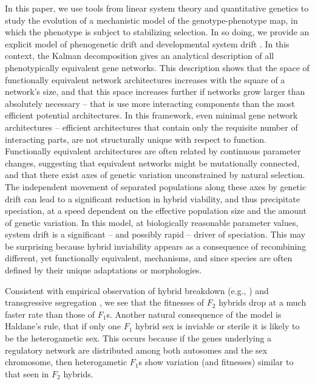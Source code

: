 \documentclass{article}
\newcommand{\plr}[1]{\todo[color=blue!25]{#1}}
\newcommand{\plr}[1]{{\color{blue}\it #1}}
\newcommand{\1}{\mathbbm{1}}
\begin{document}
In this paper, we use tools from linear system theory and quantitative genetics
to study the evolution of a mechanistic model of the genotype-phenotype map, 
in which the phenotype is subject to stabilizing selection.
In so doing, we provide an explicit model of
phenogenetic drift \citep{weiss2000phenogenetic} and developmental system drift \citep{true2001developmental}.
In this context, the Kalman decomposition \citep{kalman1963mathematical}
gives an analytical description of all phenotypically equivalent gene networks.
This description shows that the space of functionally equivalent network architectures increases with the square of a network's size,
and that this space increases further if networks grow larger than absolutely necessary -- that is use more interacting components than the most efficient potential architectures.
In this framework, even minimal gene network architectures -- efficient architectures that contain only the requisite number of interacting parts,
are not structurally unique with respect to function.
Functionally equivalent architectures are often related by continuous parameter changes, suggesting that equivalent networks might be mutationally connected, 
and that there exist axes of genetic variation unconstrained by natural selection.
The independent movement of separated populations along these axes by genetic drift
can lead to a significant reduction in hybrid viability, and thus precipitate speciation,
at a speed dependent on the effective population size and the amount of genetic variation. 
In this model, at biologically reasonable parameter values,
system drift is a significant -- and possibly rapid -- driver of speciation.
This may be surprising because
hybrid inviability appears as a consequence of recombining different, yet functionally equivalent, mechanisms, and since species are often defined by their unique adaptations or morphologies. 

Consistent with empirical observation of hybrid breakdown (e.g., \citet{plotner2017chlorosis}) and transgressive segregation \citep{transgressive}, 
we see that the fitnesses of $F_2$ hybrids drop at a much faster rate than those of $F_1$s.
Another natural consequence of the model is Haldane's rule,
that if only one $F_1$ hybrid sex is inviable or sterile it is likely to be the heterogametic sex.
This occurs because if the genes underlying a regulatory network are distributed among both autosomes and the sex chromosome, 
then heterogametic $F_1$s show variation (and fitnesses) similar to that seen in $F_2$ hybrids.
\end{document}
